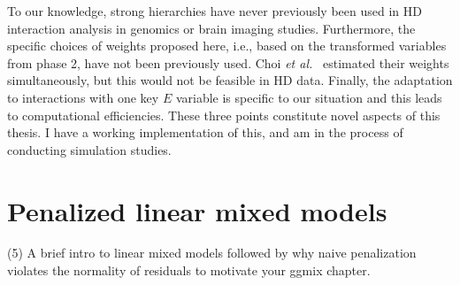 To our knowledge, strong hierarchies have never previously been used in HD interaction analysis in genomics or brain imaging studies. Furthermore, the specific choices of weights proposed here, i.e., based on the transformed variables from phase 2, have not been previously used. Choi \textit{et al.}~\citep{choi2010variable} estimated their weights simultaneously, but this would not be feasible in HD data. Finally, the adaptation to interactions with one key $E$ variable is specific to our situation and this leads to computational efficiencies. These three points constitute novel aspects of this thesis. I have a working implementation of this, and am in the process of conducting simulation studies.


\section{Penalized linear mixed models}
(5) A brief intro to linear mixed models followed by why naive penalization violates the normality of residuals to motivate your ggmix chapter.


